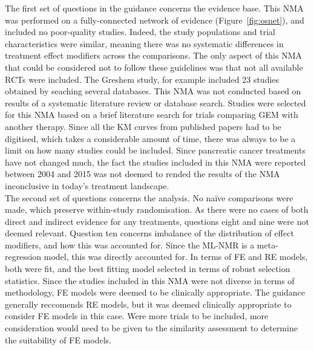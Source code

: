 The first set of questions in the guidance concerns the evidence base. This NMA was performed on a fully-connected network of evidence (Figure~\ref{fig:osnet}), and included no poor-quality studies. Indeed, the study populations and trial characteristics were similar, meaning there was no systematic differences in treatment effect modifiers across the comparisons. The only aspect of this NMA that could be considered not to follow these guidelines was that not all available RCTs were included. The Greshem study, for example included 23 studies obtained by seaching several databases. This NMA was not conducted based on results of a systematic literature review or database search. Studies were selected for this NMA based on a brief literature search for trials comparing GEM with another therapy. Since all the KM curves from published papers had to be digitised, which takes a considerable amount of time, there was always to be a limit on how many studies could be included. Since pancreatic cancer treatments have not changed much, the fact the studies included in this NMA were reported between 2004 and 2015 was not deemed to rended the results of the NMA inconclusive in today's treatment landscape. \\

The second set of questions concerns the analysis. No na\"ive comparisons were made, which preserve within-study randomisation. As there were no cases of both direct and indirect evidence for any treatments, questions eight and nine were not deemed relevant. Question ten concerns imbalance of the distribution of effect modifiers, and how this was accounted for. Since the ML-NMR is a meta-regression model, this was directly accounted for. In terms of FE and RE models, both were fit, and the best fitting model selected in terms of robust selection statistics. Since the studies included in this NMA were not diverse in terms of methodology, FE models were deemed to be clinically appropriate. The guidance generally reccomends RE models, but it was deemed clinically appropriate to consider FE models in this case. Were more trials to be included, more consideration would need to be given to the similarity assessment to determine the suitability of FE models. \\

